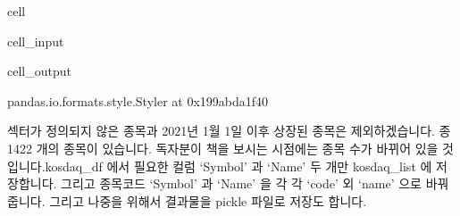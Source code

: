 \documentclass[letterpaper,10pt,english]{jupyterBook}
\begin{document}
\begin{sphinxuseclass}{cell}\begin{sphinxVerbatimInput}

\begin{sphinxuseclass}{cell_input}
\begin{sphinxVerbatim}[commandchars=\\\{\}]
  
\end{sphinxVerbatim}

\end{sphinxuseclass}\end{sphinxVerbatimInput}
\begin{sphinxVerbatimOutput}

\begin{sphinxuseclass}{cell_output}
\begin{sphinxVerbatim}[commandchars=\\\{\}]
\PYGZlt{}pandas.io.formats.style.Styler at 0x199abda1f40\PYGZgt{}
\end{sphinxVerbatim}

\end{sphinxuseclass}\end{sphinxVerbatimOutput}

\end{sphinxuseclass}
\sphinxAtStartPar
 섹터가 정의되지 않은 종목과 2021년 1월 1일 이후 상장된 종목은 제외하겠습니다. 종 1422 개의 종목이 있습니다. 독자분이 책을 보시는 시점에는 종목 수가 바뀌어 있을 것입니다.kosdaq\_df 에서 필요한 컬럼 ‘Symbol’ 과 ‘Name’ 두 개만 kosdaq\_list 에 저장합니다. 그리고 종목코드 ‘Symbol’ 과 ‘Name’ 을 각 각 ‘code’ 외 ‘name’ 으로 바꿔줍니다. 그리고 나중을 위해서 결과물을 pickle 파일로 저장도 합니다.
\end{document}

